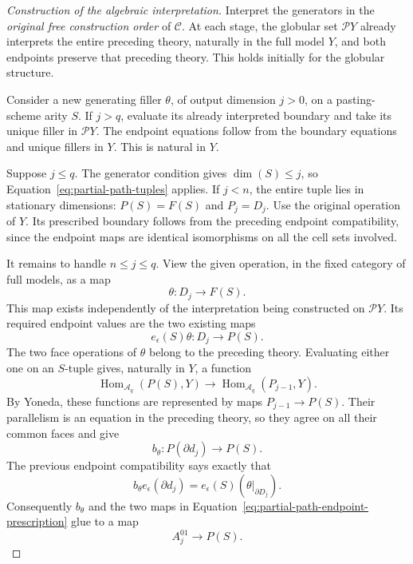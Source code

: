 \documentclass[11pt,letterpaper]{article}
\numberwithin{equation}{section}
\theoremstyle{plain}
\theoremstyle{definition}
\theoremstyle{remark}
\begin{document}
\begin{proof}[Construction of the algebraic interpretation]
Interpret the generators in the \emph{original free construction order}
of \(\mathcal C\).  At each stage, the globular set
\(\mathcal P Y\) already interprets the entire preceding theory,
naturally in the full model \(Y\), and both endpoints preserve that
preceding theory.  This holds initially for the globular structure.

Consider a new generating filler \(\theta\), of output dimension
\(j>0\), on a pasting-scheme arity \(S\).  If \(j>q\),
evaluate its already interpreted boundary and take its unique filler
in \(\mathcal P Y\).  The endpoint equations follow from the
boundary equations and unique fillers in \(Y\).  This is natural
in \(Y\).

Suppose \(j\le q\).  The generator condition gives
\(\dim(S)\le j\), so Equation~\eqref{eq:partial-path-tuples}
applies.  If \(j<n\), the entire tuple lies in stationary
dimensions: \(P(S)=F(S)\) and \(P_j=D_j\).  Use the original
operation of \(Y\).  Its prescribed boundary follows from the
preceding endpoint compatibility, since the endpoint maps are identical
isomorphisms on all the cell sets involved.

It remains to handle \(n\le j\le q\).  View the given operation,
in the fixed category of full models, as a map
\[
                         \theta:D_j\longrightarrow F(S).
\]
This map exists independently of the interpretation being constructed
on \(\mathcal P Y\).  Its required endpoint values are the two
existing maps
\begin{equation}\label{eq:partial-path-endpoint-prescription}
             e_\epsilon(S)\theta:D_j\longrightarrow P(S).
\end{equation}
The two face operations of \(\theta\) belong to the preceding
theory.  Evaluating either one on an \(S\)-tuple gives, naturally
in \(Y\), a function
\[
 \operatorname{Hom}_{\mathcal A_q}(P(S),Y)
       \longrightarrow\operatorname{Hom}_{\mathcal A_q}(P_{j-1},Y).
\]
By Yoneda, these functions are represented by maps
\(P_{j-1}\to P(S)\).  Their parallelism is an equation in the
preceding theory, so they agree on all their common faces and give
\[
                 b_\theta:P(\partial d_j)\longrightarrow P(S).
\]
The previous endpoint compatibility says exactly that
\begin{equation}\label{eq:partial-path-boundary-compatibility}
 b_\theta e_\epsilon(\partial d_j)
       =e_\epsilon(S)(\theta|_{\partial D_j}).
\end{equation}
Consequently \(b_\theta\) and the two maps in
Equation~\eqref{eq:partial-path-endpoint-prescription} glue to a map
\begin{equation}\label{eq:partial-path-two-sided-prescription}
                         A_j^{01}\longrightarrow P(S).
\end{equation}


\end{proof}
\end{document}
